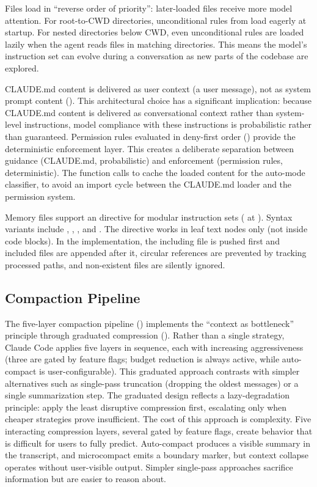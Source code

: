 Files load in ``reverse order of priority'': later-loaded files receive more model attention. For root-to-CWD directories, unconditional rules from  load eagerly at startup. For nested directories below CWD, even unconditional rules are loaded lazily when the agent reads files in matching directories. This means the model's instruction set can evolve during a conversation as new parts of the codebase are explored.

CLAUDE.md content is delivered as user context (a user message), not as system prompt content (). This architectural choice has a significant implication: because CLAUDE.md content is delivered as conversational context rather than system-level instructions, model compliance with these instructions is probabilistic rather than guaranteed. Permission rules evaluated in deny-first order () provide the deterministic enforcement layer. This creates a deliberate separation between guidance (CLAUDE.md, probabilistic) and enforcement (permission rules, deterministic). The function calls  to cache the loaded content for the auto-mode classifier, to avoid an import cycle between the CLAUDE.md loader and the permission system.

Memory files support an  directive for modular instruction sets ( at ). Syntax variants include , , , and . The directive works in leaf text nodes only (not inside code blocks). In the implementation, the including file is pushed first and included files are appended after it, circular references are prevented by tracking processed paths, and non-existent files are silently ignored.

\subsection{Compaction Pipeline}
\label{sec:context:compaction}

The five-layer compaction pipeline () implements the ``context as bottleneck'' principle through graduated compression (). Rather than a single strategy, Claude Code applies five layers in sequence, each with increasing aggressiveness (three are gated by feature flags; budget reduction is always active, while auto-compact is user-configurable). This graduated approach contrasts with simpler alternatives such as single-pass truncation (dropping the oldest messages) or a single summarization step. The graduated design reflects a lazy-degradation principle: apply the least disruptive compression first, escalating only when cheaper strategies prove insufficient. The cost of this approach is complexity. Five interacting compression layers, several gated by feature flags, create behavior that is difficult for users to fully predict. Auto-compact produces a visible summary in the transcript, and microcompact emits a boundary marker, but context collapse operates without user-visible output. Simpler single-pass approaches sacrifice information but are easier to reason about.


